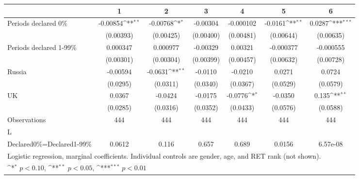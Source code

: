 {
\def\sym#1{\ifmmode^{#1}\else\(^{#1}\)\fi}
\begin{tabular}{l*{6}{c}}
\hline\hline
                &\multicolumn{1}{c}{1}&\multicolumn{1}{c}{2}&\multicolumn{1}{c}{3}&\multicolumn{1}{c}{4}&\multicolumn{1}{c}{5}&\multicolumn{1}{c}{6}\\
\hline
Periods declared 0\%& -0.00854\sym{**} & -0.00768\sym{*}  & -0.00304         &-0.000102         &  -0.0161\sym{**} &   0.0287\sym{***}\\
                &(0.00393)         &(0.00425)         &(0.00400)         &(0.00481)         &(0.00644)         &(0.00635)         \\
Periods declared 1-99\%& 0.000347         & 0.000977         & -0.00329         &  0.00321         &-0.000377         &-0.000555         \\
                &(0.00301)         &(0.00304)         &(0.00399)         &(0.00457)         &(0.00632)         &(0.00728)         \\
Russia          & -0.00594         &  -0.0631\sym{**} &  -0.0110         &  -0.0210         &   0.0271         &   0.0724         \\
                & (0.0295)         & (0.0311)         & (0.0340)         & (0.0367)         & (0.0529)         & (0.0579)         \\
UK              &   0.0367         &  -0.0424         &  -0.0175         &  -0.0776\sym{*}  &  -0.0350         &    0.135\sym{**} \\
                & (0.0285)         & (0.0316)         & (0.0352)         & (0.0433)         & (0.0576)         & (0.0588)         \\
\hline
Observations    &      444         &      444         &      444         &      444         &      444         &      444         \\
L               &                  &                  &                  &                  &                  &                  \\
Declared\space{}0\%=Declared\space{}1-99\%&   0.0612         &    0.116         &    0.657         &    0.689         &   0.0156         & 6.57e-08         \\
\hline\hline
\multicolumn{7}{l}{\footnotesize Logistic regression, marginal coefficients. Individual controls are gender, age, and RET rank (not shown).}\\
\multicolumn{7}{l}{\footnotesize \sym{*} \(p<0.10\), \sym{**} \(p<0.05\), \sym{***} \(p<0.01\)}\\
\end{tabular}
}
